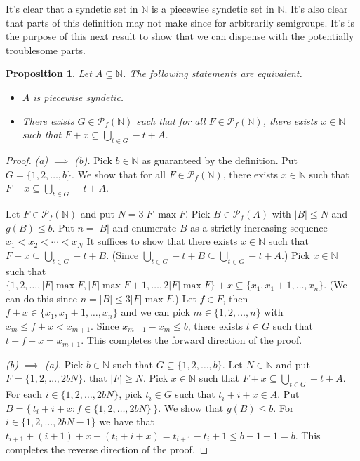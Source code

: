 \documentclass[12pt]{article}
\theoremstyle{plain}
\newtheorem{prop}[thm]{Proposition}
\theoremstyle{definition}
\newcommand{\bbN}{\mathbb{N}}
\newcommand{\Pf}{\mathcal{P}_f}
\begin{document}
It's clear that a syndetic set in $\bbN$ is a piecewise syndetic set
in $\bbN$.
It's also clear that  parts of this definition may not make since
for arbitrarily semigroups.
It's is the purpose of this next result to show that we can dispense
with the potentially troublesome parts.

\begin{prop}
  Let $A \subseteq \bbN$.
  The following statements are equivalent.
  \begin{itemize}
    \item[(a)] $A$ is piecewise syndetic.
    
    \item[(b)] There exists $G \in \Pf(\bbN)$ such that for all $F \in
      \Pf(\bbN)$, there exists $x \in \bbN$ such that $F+x \subseteq
      \bigcup_{t \in G} -t+A$. 
  \end{itemize}
\end{prop}
\begin{proof}
  \textsl{(a) $\implies$ (b).}
  Pick $b \in \bbN$ as guaranteed by the definition. 
  Put $G = \{1, 2, \ldots, b\}$.
  We show that for all $F \in \Pf(\bbN)$, there exists $x \in \bbN$
  such that $F+x \subseteq \bigcup_{t \in G} -t + A$.

  Let $F \in \Pf(\bbN)$ and put $N = 3 |F| \max F$. 
  Pick $B \in \Pf(A)$ with $|B| \le N$ and $g(B) \le b$. 
  Put $n = |B|$ and enumerate $B$ as a strictly increasing sequence
  $x_1 < x_2 < \cdots  < x_N$
  It suffices to show that there exists $x \in \bbN$ such
  that $F + x \subseteq \bigcup_{t \in G} -t + B$.
  (Since $\bigcup_{t \in G} -t + B \subseteq \bigcup_{t \in G} -t +
  A$.)
  Pick $x \in \bbN$ such that $\{1, 2, \ldots, |F| \max F, |F| \max F
  + 1, \ldots, 2|F| \max F\} + x \subseteq \{x_1, x_1 + 1,
  \ldots, x_n\}$.
  (We can do this since $n = |B| \le 3 |F| \max F$.)
  Let $f \in F$, then $f + x \in \{x_1, x_1 + 1, \ldots, x_n
  \}$ and we can pick $m \in \{1, 2, \ldots, n\}$ with $x_m \le f+x < x_{m+1}$. 
  Since $x_{m+1} - x_m \le b$, there exists $t \in G$ such that $t +
  f + x = x_{m+1}$. 
  This completes the forward direction of the proof.  
  
  \textsl{(b) $\implies$ (a).}
  Pick $b \in \bbN$ such that $G \subseteq \{1, 2, \ldots, b\}$. 
  Let $N \in \bbN$ and put $F = \{1, 2, \ldots, 2bN\}$. that $|F| \ge N$. 
  Pick $x \in \bbN$ such that $F + x \subseteq \bigcup_{t \in G} -t +
  A$. 
  For each $i \in \{1, 2, \ldots, 2bN\}$, pick $t_i \in G$ such that
  $t_i + i + x \in A$. 
  Put $B = \bigl\{\, t_i + i + x : f \in \{1, 2, \ldots, 2bN\} \,\bigr\}$. 
  We show that $g(B) \le b$. 
  For $i \in \{1, 2, \ldots, 2bN-1\}$ we have that $t_{i+1} + (i+1) +
  x - (t_i + i + x) = t_{i+1} - t_i + 1 \le b - 1 + 1 = b$.
  This completes the reverse direction of the proof.
\end{proof}
\end{document}

